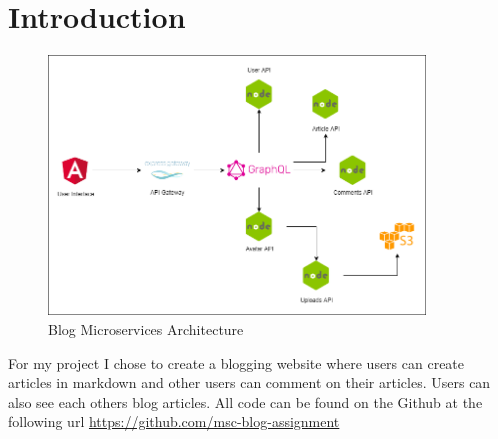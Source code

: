 \section{Introduction}

\begin{figure}[H]
  \centering
  \includegraphics[scale=0.5,width=100mm]{./images/architecture.png}
  \caption{Blog Microservices Architecture}
  \label{fig:graph-error-bars}
\end{figure}

For my project I chose to create a blogging website where users can create articles in markdown and other users can comment on their articles. Users can also see each others blog articles. All code can be found on the Github at the following url \url{https://github.com/msc-blog-assignment}